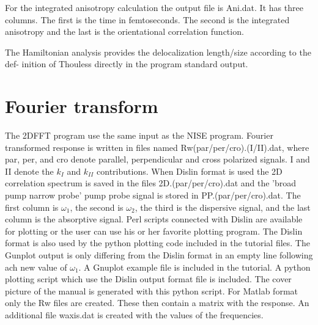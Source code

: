 For the integrated anisotropy calculation the output file is Ani.dat. It has three columns. The first is the time in femtoseconds. The second is the integrated anisotropy and the last is the orientational correlation function.

The Hamiltonian analysis provides the delocalization length/size according to the def- 
inition of Thouless \cite{Thouless.1974.PR.13.93} directly in the program standard output. 

\section{Fourier transform \label{sec:Fourier}}
The 2DFFT program use the same input as the NISE program.
Fourier transformed response is written in files named Rw(par/per/cro).(I/II).dat, where par, per, and cro denote parallel, perpendicular and cross polarized signals. I and II denote the $k_I$ and $k_{II}$ contributions. When Dislin format is used the 2D correlation spectrum is saved in the files 2D.(par/per/cro).dat and the 'broad pump narrow probe' pump probe signal is stored in PP.(par/per/cro).dat.
The first column is $\omega_1$, the second is $\omega_2$, the third is the dispersive signal, and the
last column is the absorptive signal. Perl scripts connected with Dislin are available for plotting or the
user can use his or her favorite plotting program. The Dislin format is also used by the python plotting code included in the tutorial files.
The Gunplot output is only differing from the Dislin format in an empty line following ach new value of $\omega_1$. A Gnuplot example file is included in the tutorial. A python plotting script which use the Dislin output format file is included. The cover picture 
of the manual is generated with this python script.
 For Matlab format only the Rw files are created. These
then contain a matrix with the response. An additional file waxis.dat is created with the values of the
frequencies.


